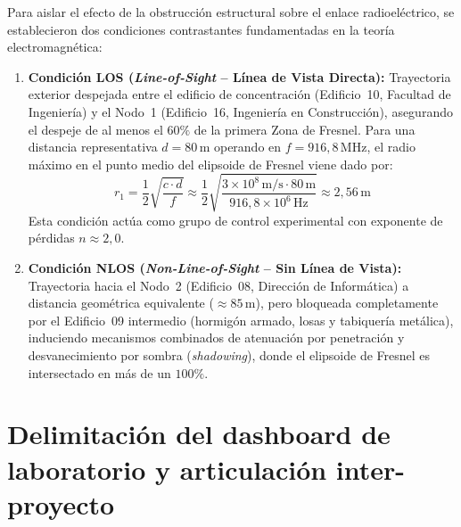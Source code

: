 \documentclass[12pt,oneside,openany,spanish,oldfontcommands]{memoir}
\begin{document}
Para aislar el efecto de la obstrucción estructural sobre el enlace radioeléctrico, se establecieron
dos condiciones contrastantes fundamentadas en la teoría electromagnética:
\begin{enumerate}
      \item \textbf{Condición LOS (\textit{Line-of-Sight} -- Línea de Vista Directa):} Trayectoria exterior
      despejada entre el edificio de concentración (Edificio~10, Facultad de Ingeniería) y el Nodo~1 (Edificio~16,
      Ingeniería en Construcción), asegurando el despeje de
      al menos el $60\%$ de la primera Zona de Fresnel. Para una distancia representativa $d = 80\,\text{m}$
      operando en $f = 916,8\,\text{MHz}$, el radio máximo en el punto medio del elipsoide de Fresnel viene
      dado por:
      \begin{equation}\label{eq:fresnel-calc}
          r_1 = \frac{1}{2} \sqrt{\frac{c \cdot d}{f}}
          \approx \frac{1}{2} \sqrt{\frac{3 \times 10^8\,\text{m/s} \cdot 80\,\text{m}}{916,8 \times 10^6\,\text{Hz}}}
          \approx 2,56\,\text{m}
      \end{equation}
      Esta condición actúa como grupo de control experimental con exponente de pérdidas $n \approx 2,0$.

      \item \textbf{Condición NLOS (\textit{Non-Line-of-Sight} -- Sin Línea de Vista):} Trayectoria hacia
      el Nodo~2 (Edificio~08, Dirección de Informática) a distancia geométrica equivalente ($\approx 85\,\text{m}$), pero bloqueada
      completamente por el Edificio~09 intermedio (hormigón armado, losas y tabiquería metálica),
      induciendo mecanismos combinados de atenuación por penetración y desvanecimiento por sombra
      (\textit{shadowing}), donde el elipsoide de Fresnel es intersectado en más de un $100\%$.
\end{enumerate}

\section{Delimitación del dashboard de laboratorio y articulación inter-proyecto}\label{sec:delimitacion-dashboard}
\end{document}
